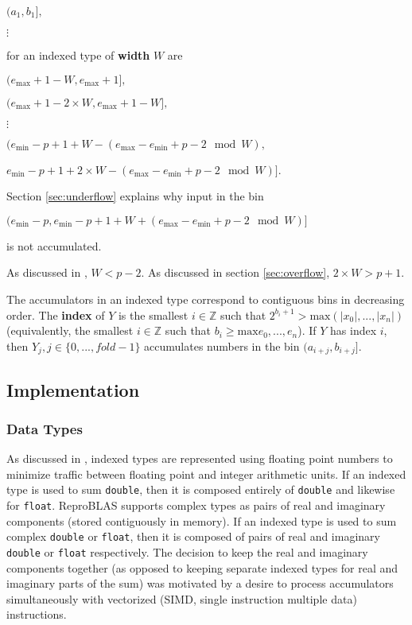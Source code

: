 \documentclass[12pt]{article}
\providecommand{\Z}{\ensuremath{\mathbb{Z}}}
\providecommand{\min}{\ensuremath{\text{min}}}
\providecommand{\max}{\ensuremath{\text{max}}}
\theoremstyle{plain}
\begin{document}
    $(a_1, b_1],$

    $\vdots$

    for an indexed type of \textbf{width} $W$ are

    $(e_{\max} + 1 - W, e_{\max} + 1],$

    $(e_{\max} + 1 - 2\times W, e_{\max} + 1 - W],$

    $\vdots$

    $(e_{\min} - p + 1 + W - (e_{\max} - e_{\min} + p - 2\mod W),$

    \indent \indent $e_{\min} - p + 1 + 2 \times W - (e_{\max} - e_{\min} + p - 2 \mod W)]$.

    Section \ref{sec:underflow} explains why input in the bin

    $(e_{\min} - p, e_{\min} - p + 1 + W + (e_{\max} - e_{\min} + p - 2 \mod W)]$

    is not accumulated.

    As discussed in \cite{repsum}, $W < p - 2$. As discussed in section \ref{sec:overflow}, $2\times W > p + 1$.

    The accumulators in an indexed type correspond to contiguous bins in decreasing order. The \textbf{index} of $Y$ is the smallest $i \in \Z$ such that $2^{b_i + 1} > \max(|x_0|, ..., |x_n|)$ (equivalently, the smallest $i \in \Z$ such that $b_i \geq \max{e_0, ..., e_n}$). If $Y$ has index $i$, then $Y_j, j \in \{0, ..., fold - 1\}$ accumulates numbers in the bin $(a_{i + j}, b_{i + j}]$.

  \subsection{Implementation}
    \subsubsection{Data Types}
      As discussed in \cite{repsum}, indexed types are represented using floating point numbers to minimize traffic between floating point and integer arithmetic units. If an indexed type is used to sum \verb|double|, then it is composed entirely of \verb|double| and likewise for \verb|float|. ReproBLAS supports complex types as pairs of real and imaginary components (stored contiguously in memory). If an indexed type is used to sum complex \verb|double| or \verb|float|, then it is composed of pairs of real and imaginary \verb|double| or \verb|float| respectively. The decision to keep the real and imaginary components together (as opposed to keeping separate indexed types for real and imaginary parts of the sum) was motivated by a desire to process accumulators simultaneously with vectorized (SIMD, single instruction multiple data) instructions.
\end{document}
